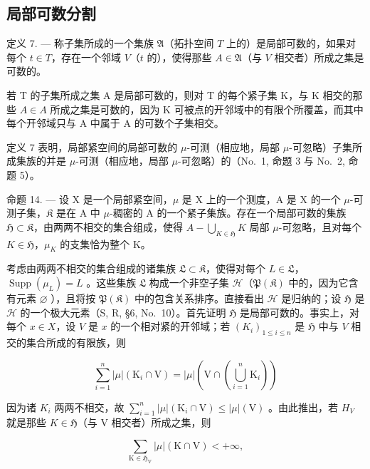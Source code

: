 \subsection{局部可数分割}

定义 7. --- 称子集所成的一个集族 \(\mathfrak{A}\)（拓扑空间 \(T\) 上的）是局部可数的，如果对每个 \(t \in T\)，存在一个邻域 \(V\)（\(t\) 的），使得那些 \(A \in \mathfrak{A}\)（与 \(V\) 相交者）所成之集是可数的。

若 T 的子集所成之集 A 是局部可数的，则对 T 的每个紧子集 K，与 K 相交的那些 \(A \in A\) 所成之集是可数的，因为 K 可被点的开邻域中的有限个所覆盖，而其中每个开邻域只与 A 中属于 A 的可数个子集相交。

定义 7 表明，局部紧空间的局部可数的 \(\mu\)-可测（相应地，局部 \(\mu\)-可忽略）子集所成集族的并是 \(\mu\)-可测（相应地，局部 \(\mu\)-可忽略）的（No.~1, 命题 3 与 No.~2, 命题 5）。

命题 14. --- 设 X 是一个局部紧空间，\(\mu\) 是 X 上的一个测度，A 是 X 的一个 \(\mu\)-可测子集，\(\mathfrak{K}\) 是在 A 中 \(\mu\)-稠密的 A 的一个紧子集族。存在一个局部可数的集族 \(\mathfrak{H} \subset \mathfrak{K}\)，由两两不相交的集合组成，使得 \(A - \bigcup_{K \in \mathfrak{H}} K\) 局部 \(\mu\)-可忽略，且对每个 \(K \in \mathfrak{H}\)，\(\mu_K\) 的支集恰为整个 K。

考虑由两两不相交的集合组成的诸集族 \(\mathfrak{L} \subset \mathfrak{K}\)，使得对每个 \(L \in \mathfrak{L}\)，\(\operatorname{Supp}(\mu_L) = L\) 。这些集族 \(\mathfrak{L}\) 构成一个非空子集 \(\mathscr{H}\)（\(\mathfrak{P}(\mathfrak{K})\) 中的，因为它含有元素 \(\varnothing\) ），且将按 \(\mathfrak{P}(\mathfrak{K})\) 中的包含关系排序。直接看出 \(\mathscr{H}\) 是归纳的；设 \(\mathfrak{H}\) 是 \(\mathscr{H}\) 的一个极大元素（S, R, §6, No.~10）。首先证明 \(\mathfrak{H}\) 是局部可数的。事实上，对每个 \(x \in X\)，设 \(V\) 是 \(x\) 的一个相对紧的开邻域；若 \((K_i)_{1 \leqslant i \leqslant n}\) 是 \(\mathfrak{H}\) 中与 \(V\) 相交的集合所成的有限族，则

\[
\sum_ {i = 1} ^ {n} | \mu | \left(\mathrm{K} _ {i} \cap \mathrm{V}\right) = | \mu | \left(\mathrm{V} \cap \left(\bigcup_ {i = 1} ^ {n} \mathrm{K} _ {i}\right)\right)
\]

因为诸 \(K_{i}\) 两两不相交，故 \(\sum_{i=1}^{n}| \mu |(\mathrm{K}_{i} \cap \mathrm{V}) \leqslant |\mu |(\mathrm{V})\) 。由此推出，若 \(H_{V}\) 就是那些 \(K \in \mathfrak{H}\)（与 V 相交者）所成之集，则

\[
\sum_ {\mathrm{K} \in \mathfrak {H} _ {\mathrm{V}}} | \mu | (\mathrm{K} \cap \mathrm{V}) <   + \infty ,
\]

